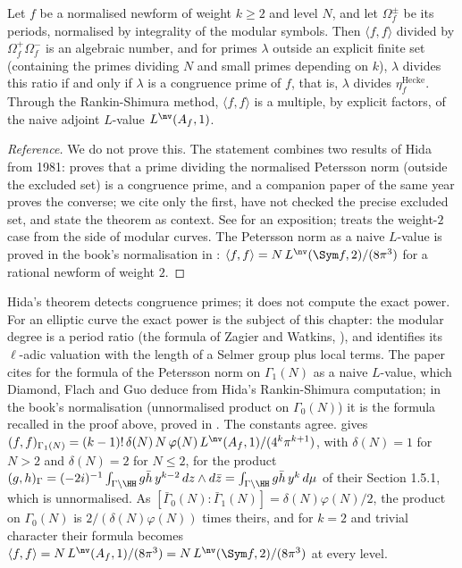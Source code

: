 \begin{theorem}[Hida]\label{thm:congruence:hida}
Let $f$ be a normalised newform of weight $k\ge2$ and level $N$, and let $\Omega^\pm_f$ be its periods, normalised by integrality of the modular symbols. Then $\langle f,f\rangle$ divided by
$\Omega^+_f\Omega^-_f$ is an algebraic number, and for primes $\lambda$ outside an explicit finite set (containing the primes dividing $N$ and small primes depending on $k$), $\lambda$ divides this
ratio if and only if $\lambda$ is a congruence prime of $f$, that is, $\lambda$ divides $\eta^{\mathrm{Hecke}}_f$. Through the Rankin-Shimura method, $\langle f,f\rangle$ is a multiple, by explicit factors,
of the naive adjoint $L$-value $L^{\nv}(A_f,1)$.
\end{theorem}

\begin{proof}[Reference]
We do not prove this. The statement combines two results of Hida from 1981: \cite{Hida81} proves that a prime dividing the normalised Petersson norm (outside the excluded set) is a
congruence prime, and a companion paper of the same year proves the converse; we cite only the first, have not checked the precise excluded set, and state the theorem as context. See
\cite{HidaBook} for an exposition; \cite{Ribet83} treats the weight-$2$ case from the side of modular curves. The Petersson norm as a naive $L$-value is proved in the book's normalisation in : $\langle f,f\rangle=N\,L^{\nv}(\Sym f,2)/(8\pi^3)$ for a
rational newform of weight $2$.
\end{proof}

\begin{remark}\label{rem:congruence:hida-to-dfg}
Hida's theorem detects congruence primes; it does not compute the exact power. For an elliptic curve the exact power is the subject of this chapter: the
modular degree is a period ratio (the formula of Zagier and Watkins, ), and  identifies its $\ell$-adic valuation with the length of a
Selmer group plus local terms. The paper cites \cite[Lemma 2.12]{DFG04} for the formula of the Petersson norm on $\Gamma_1(N)$ as a naive $L$-value, which Diamond,
Flach and Guo deduce from Hida's Rankin-Shimura computation; in the book's normalisation (unnormalised product on $\Gamma_0(N)$) it is the formula recalled in the proof
above, proved in . The constants agree. \cite[Lemma 2.12]{DFG04} gives $(f,f)_{\Gamma_1(N)}=(k-1)!\,\delta(N)\,N\,\varphi(N)\,L^{\nv}(A_f,1)/(4^k\pi^{k+1})$, with
$\delta(N)=1$ for $N>2$ and $\delta(N)=2$ for $N\le2$, for the product $(g,h)_\Gamma=(-2i)^{-1}\int_{\Gamma\backslash\HH}g\bar h\,y^{k-2}\,dz\wedge d\bar z=\int_{\Gamma\backslash\HH}g\bar h\,y^k\,d\mu$ of their Section 1.5.1, which is
unnormalised. As $[\bar\Gamma_0(N):\bar\Gamma_1(N)]=\delta(N)\varphi(N)/2$, the product on $\Gamma_0(N)$ is $2/(\delta(N)\varphi(N))$ times theirs, and for $k=2$ and trivial character their formula becomes
$\langle f,f\rangle=N\,L^{\nv}(A_f,1)/(8\pi^3)=N\,L^{\nv}(\Sym f,2)/(8\pi^3)$ at every level.
\end{remark}

